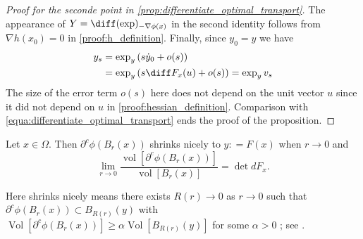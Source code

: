 \begin{proof}[Proof for the seconde point in \cref{prop:differentiate_optimal_transport}]
	The appearance of \( Y = \diff ( \exp ) _ { - \nabla \phi ( x ) } \) in the second identity follows from
	\( \nabla h \left( x _ { 0 } \right) = 0 \) in \cref{proof:h_definition}.
	Finally, since \( y _ { 0 } = y \) we have
	\begin{align*}
		y _ { s } & = \exp _ { y } \left( s \dot { y } _ { 0 } + o ( s ) \right)                             \\
		          & = \exp _ { y } \left( s \diff F _ { x } ( u ) + o ( s ) \right) = \exp _ { y } v _ { s }
	\end{align*}
	The size of the error term \( o ( s ) \) here does not depend on the unit vector \( u \)
	since it did not depend on \( u \) in \cref{proof:hessian_definition}.
	Comparison with \cref{equa:differentiate_optimal_transport} ends the proof
	of the proposition.
\end{proof}

\begin{lem}
	Let \( x \in \Omega \).
	Then \( \partial ^ { c } \phi \left( B _ { r } ( x ) \right) \) shrinks nicely to \( y : = F ( x ) \) when \( r \rightarrow 0 \) and
	\[ \lim _ { r \rightarrow 0 } \frac { \operatorname { vol } \left[ \partial ^ { c } \phi \left( B _ { r } ( x ) \right) \right] } { \operatorname { vol } \left[ B _ { r } ( x ) \right] } = \operatorname { det } d F _ { x } .\]
\end{lem}

Here shrinks nicely means there exists \( R ( r ) \rightarrow 0 \) as \( r \rightarrow 0 \) such that
\( \partial ^ { c } \phi \left( B _ { r } ( x ) \right) \subset B _ { R ( r ) } ( y ) \)
with  \( \operatorname{Vol} \left[\partial^c \phi (B_r (x)) \right] \geq
\alpha \operatorname{Vol} \left[ B _ { R ( r ) } ( y ) \right]\) 
for some $\alpha >0$ ; see \cite[140]{Rudin1987real}.
